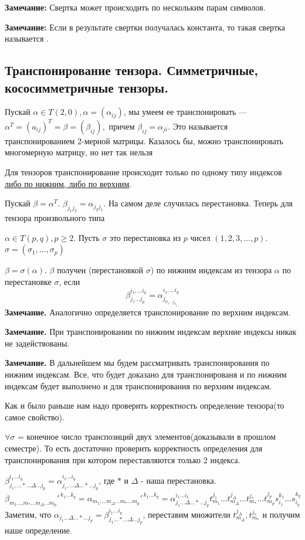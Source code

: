 \textbf{Замечание:} Свертка может происходить по нескольким парам символов.

\textbf{Замечание:} Если в результате свертки получалась константа, то такая свертка называется .


\newpage
\subsection{Транспонирование тензора. Симметричные, кососимметричные тензоры.}

Пускай $\alpha \in T(2,0), \alpha = (\alpha_{ij})$, мы умеем ее транспонировать --- $\alpha^T =(a_{ij})^T =\beta = (\beta_{ij}),$ причем $\beta_{ij} = \alpha_{ji}$. Это называется транспонированием 2-мерной матрицы.
Казалось бы, можно транспонировать многомерную матрицу, но нет так нельзя

Для тензоров транспонирование происходит только по одному типу индексов \uline{либо по нижним, либо по верхним}.

Пускай $\beta = \alpha^T$. $\beta_{j_1j_2} = \alpha_{j_2j_1}$. На самом деле случилась перестановка. Теперь для тензора произвольного типа

 $\alpha \in T(p,q), p\geq 2$. Пусть $\sigma$ это перестановка из $p$ чисел $(1,2,3,\ldots, p)$. $\sigma = (\sigma_1,\ldots,\sigma_p)$

$\beta = \sigma(\alpha)$. $\beta$ получен  (перестановкой $\sigma$) по нижним индексам из тензора $\alpha$ по перестановке $\sigma$, если
$$\beta_{j_1\ldots j_p}^{i_1,\ldots i_q} = \alpha_{j_{\sigma_1 \ldots j_{\sigma_p}}}^{i_1,\ldots i_q}$$
\textbf{Замечание.} Аналогично определяется транспонирование по верхним индексам.

\textbf{Замечание.} При транспонировании по нижним индексам верхние индексы никак не задействованы.

\textbf{Замечание.} В дальнейшем мы будем рассматривать транспонирования по нижним индексам. Все, что будет доказано для транспонированя и по нижним индексам будет выполнено и для транспонирования по верхним индексам.

Как и было раньше нам надо проверить корректность определение тензора(то самое свойство).

$\forall \sigma$ = конечное число транспозиций двух элементов(доказывали в прошлом семестре). То есть достаточно проверить корректность определения для транспонирования при котором переставляются только 2 индекса.


$\beta_{j_1, \ldots* \ldots  \Delta \ldots j_p}^{i_1\ldots i_q}= \alpha_{j_1, \ldots \Delta\ldots  * \ldots j_p}^{i_1\ldots i_q}$, где $*$ и $\Delta$ - наша перестановка.
$$\beta_{m_1.\ldots m_{*}\dots m_{\Delta}\ldots m_p}'^{\, k_1 \ldots k_q} = \alpha_{m_1.\ldots m_{\Delta}\dots m_{*}\ldots m_p}'^{\, k_1 \ldots k_q}  = \alpha^{i_1 \ldots i_1}_{j_1\ldots \Delta \ldots * \ldots  j_p}t_{m_1}^{j_1} \ldots t_{m_\Delta}^{j_\Delta}\ldots t_{m_*}^{j_*} \ldots t_{m_p}^{j_p}s_{i_1}^{k_1}\ldots s_{i_q}^{k_q}$$
Заметим, что $\alpha_{j_1\ldots \Delta\ldots *\ldots j_p} = \beta_{j_1\ldots * \ldots \Delta \ldots j_p}^{i_1 \ldots i_q}$, переставим множители $t_{m_\Delta}^{j_\Delta}, t_{m_*}^{j_*}$ и получим наше определение.

